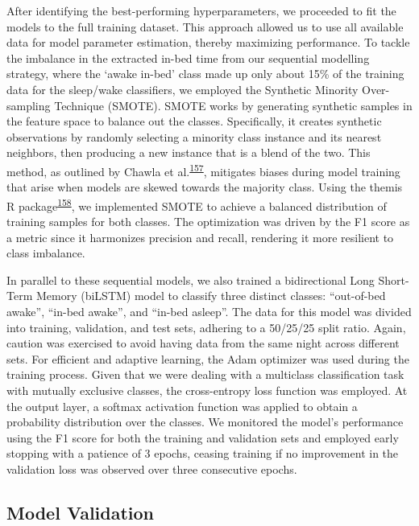 \documentclass[
  10pt,
]{scrbook}
\begin{document}
After identifying the best-performing hyperparameters, we proceeded to
fit the models to the full training dataset. This approach allowed us to
use all available data for model parameter estimation, thereby
maximizing performance. To tackle the imbalance in the extracted in-bed
time from our sequential modelling strategy, where the `awake in-bed'
class made up only about 15\% of the training data for the sleep/wake
classifiers, we employed the Synthetic Minority Over-sampling Technique
(SMOTE). SMOTE works by generating synthetic samples in the feature
space to balance out the classes. Specifically, it creates synthetic
observations by randomly selecting a minority class instance and its
nearest neighbors, then producing a new instance that is a blend of the
two. This method, as outlined by Chawla et
al.\textsuperscript{\protect\hyperlink{ref-chawla_smote_2002}{157}},
mitigates biases during model training that arise when models are skewed
towards the majority class. Using the themis R
package\textsuperscript{\protect\hyperlink{ref-themis}{158}}, we
implemented SMOTE to achieve a balanced distribution of training samples
for both classes. The optimization was driven by the F1 score as a
metric since it harmonizes precision and recall, rendering it more
resilient to class imbalance.

In parallel to these sequential models, we also trained a bidirectional
Long Short-Term Memory (biLSTM) model to classify three distinct
classes: ``out-of-bed awake'', ``in-bed awake'', and ``in-bed asleep''.
The data for this model was divided into training, validation, and test
sets, adhering to a 50/25/25 split ratio. Again, caution was exercised
to avoid having data from the same night across different sets. For
efficient and adaptive learning, the Adam optimizer was used during the
training process. Given that we were dealing with a multiclass
classification task with mutually exclusive classes, the cross-entropy
loss function was employed. At the output layer, a softmax activation
function was applied to obtain a probability distribution over the
classes. We monitored the model's performance using the F1 score for
both the training and validation sets and employed early stopping with a
patience of 3 epochs, ceasing training if no improvement in the
validation loss was observed over three consecutive epochs.

\hypertarget{model-validation}{%
\subsection{Model Validation}\label{model-validation}}
\end{document}
